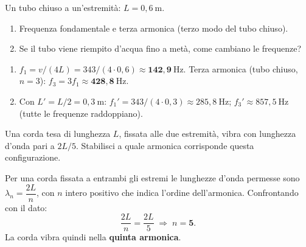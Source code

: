 \begin{question}[ID=6.2, subtitle={Tubo chiuso — frequenza fondamentale e terza armonica}, tags={tubo chiuso, armoniche}, difficulty=difficile]
Un tubo chiuso a un'estremità: $L = 0{,}6\ \mathrm{m}$.
\begin{enumerate}
\item Frequenza fondamentale e terza armonica (terzo modo del tubo chiuso).
\item Se il tubo viene riempito d'acqua fino a metà, come cambiano le frequenze?
\end{enumerate}
\begin{solution}
\begin{enumerate}
\item $f_1 = v/(4L) = 343/(4\cdot0{,}6) \approx \mathbf{142{,}9\ \mathrm{Hz}}$.
Terza armonica (tubo chiuso, $n=3$): $f_3 = 3f_1 \approx \mathbf{428{,}8\ \mathrm{Hz}}$.
\item Con $L' = L/2 = 0{,}3\ \mathrm{m}$: $f_1' = 343/(4\cdot0{,}3) \approx 285{,}8\ \mathrm{Hz}$; $f_3' \approx 857{,}5\ \mathrm{Hz}$ (tutte le frequenze raddoppiano).
\end{enumerate}
\end{solution}
\end{question}

\begin{question}[ID=6.3, subtitle={Identificazione dell'armonica con λ = 2L/5}, tags={armoniche, lunghezza d'onda}, difficulty=facile]
Una corda tesa di lunghezza $L$, fissata alle due estremità, vibra con lunghezza d'onda pari a $2L/5$. Stabilisci a quale armonica corrisponde questa configurazione.
\begin{solution}
Per una corda fissata a entrambi gli estremi le lunghezze d'onda permesse sono $\lambda_n = \dfrac{2L}{n}$, con $n$ intero positivo che indica l'ordine dell'armonica. Confrontando con il dato:
\[
\frac{2L}{n} = \frac{2L}{5} \;\Rightarrow\; n = \mathbf{5}.
\]
La corda vibra quindi nella \textbf{quinta armonica}.
\end{solution}
\end{question}

